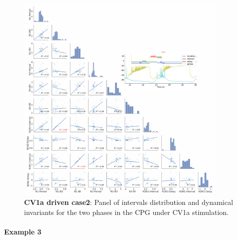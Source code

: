\begin{figure}[htbp]
	\centering
	\includegraphics[width=0.9\textwidth]{./invariants/data/SUSSEX/CV1a_driven2/images/panel_with_pairplot.pdf}
	
	\caption{\textbf{CV1a driven case2}: Panel of intervals distribution and dynamical invariants for the two phases in the CPG under CV1a stimulation.}
	\label{fig:cv1a 2 2phases pairplot}
\end{figure}




\paragraph{Example 3}


